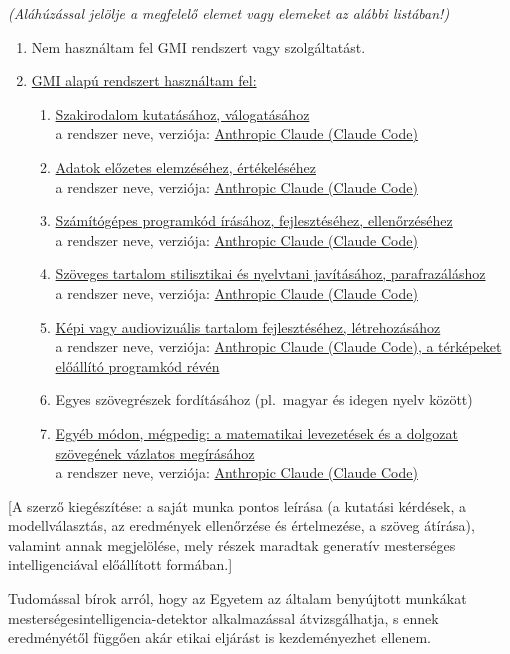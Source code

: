 \documentclass[12pt,a4paper]{article}
\theoremstyle{definition}
\theoremstyle{remark}
\begin{document}
\emph{(Aláhúzással jelölje a megfelelő elemet vagy elemeket az alábbi
listában!)}
\begin{enumerate}
  \item Nem használtam fel GMI rendszert vagy szolgáltatást.
  \item \uline{GMI alapú rendszert használtam fel:}
  \begin{enumerate}[label=\alph*)]
    \item \uline{Szakirodalom kutatásához, válogatásához}\\
      a rendszer neve, verziója: \uline{Anthropic Claude (Claude Code)}
    \item \uline{Adatok előzetes elemzéséhez, értékeléséhez}\\
      a rendszer neve, verziója: \uline{Anthropic Claude (Claude Code)}
    \item \uline{Számítógépes programkód írásához, fejlesztéséhez,
      ellenőrzéséhez}\\
      a rendszer neve, verziója: \uline{Anthropic Claude (Claude Code)}
    \item \uline{Szöveges tartalom stilisztikai és nyelvtani javításához,
      parafrazáláshoz}\\
      a rendszer neve, verziója: \uline{Anthropic Claude (Claude Code)}
    \item \uline{Képi vagy audiovizuális tartalom fejlesztéséhez,
      létrehozásához}\\
      a rendszer neve, verziója: \uline{Anthropic Claude (Claude Code),
      a térképeket előállító programkód révén}
    \item Egyes szövegrészek fordításához (pl.\ magyar és idegen nyelv
      között)
    \item \uline{Egyéb módon, mégpedig: a matematikai levezetések és a
      dolgozat szövegének vázlatos megírásához}\\
      a rendszer neve, verziója: \uline{Anthropic Claude (Claude Code)}
  \end{enumerate}
\end{enumerate}
[A szerző kiegészítése: a saját munka pontos leírása (a kutatási kérdések,
a modellválasztás, az eredmények ellenőrzése és értelmezése, a szöveg
átírása), valamint annak megjelölése, mely részek maradtak generatív
mesterséges intelligenciával előállított formában.]

Tudomással bírok arról, hogy az Egyetem az általam benyújtott munkákat
mesterséges\-intelligencia-detektor alkalmazással átvizsgálhatja, s ennek
eredményétől függően akár etikai eljárást is kezdeményezhet ellenem.
\end{document}
